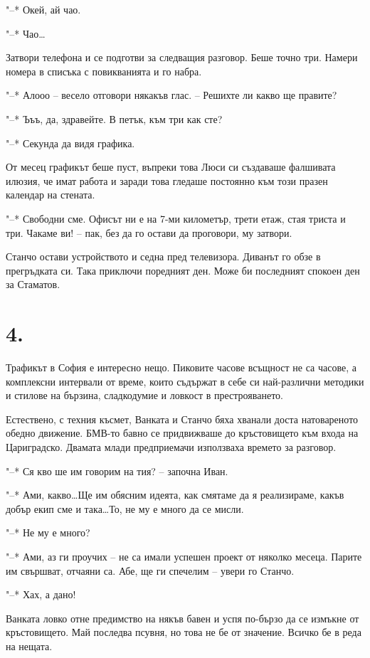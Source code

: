 \documentclass[ebook,openany,12pt]{memoir}
\begin{document}
"--* Окей, ай чао.

"--* Чао\ldots

Затвори телефона и се подготви за следващия разговор. Беше точно три. Намери номера в списъка с повикванията и го набра.

"--* Алооо – весело отговори някакъв глас. – Решихте ли какво ще правите?

"--* Ъъъ, да, здравейте. В петък, към три как сте?

"--* Секунда да видя графика. 

От месец графикът беше пуст, въпреки това Люси си създаваше фалшивата илюзия, че имат работа и заради това гледаше постоянно към този празен календар на стената.

"--* Свободни сме. Офисът ни е на 7-ми километър, трети етаж, стая триста и три. Чакаме ви! – пак, без да го остави да проговори, му затвори.

Станчо остави устройството и седна пред телевизора. Диванът го обзе в прегръдката си. Така приключи поредният ден. Може би последният спокоен ден за Стаматов.

\section*{4.}

Трафикът в София е интересно нещо. Пиковите часове всъщност не са часове, а комплексни интервали от време, които съдържат в себе си най-различни методики и стилове на бързина, сладкодумие и ловкост в престрояването.

Естествено, с техния късмет, Ванката и Станчо бяха хванали доста натовареното обедно движение. БМВ-то бавно се придвижваше до кръстовището към входа на Цариградско. Двамата млади предприемачи използваха времето за разговор.

"--* Ся кво ше им говорим на тия? – започна Иван.

"--* Ами, какво\ldots Ще им обясним идеята, как смятаме да я реализираме, какъв добър екип сме и така\ldots То, не му е много да се мисли.

"--* Не му е много?

"--* Ами, аз ги проучих – не са имали успешен проект от няколко месеца. Парите им свършват, отчаяни са. Абе, ще ги спечелим – увери го Станчо.

"--* Хах, а дано!

Ванката ловко отне предимство на някъв бавен и успя по-бързо да се измъкне от кръстовището. Май последва псувня, но това не бе от значение. Всичко бе в реда на нещата.
\end{document}
